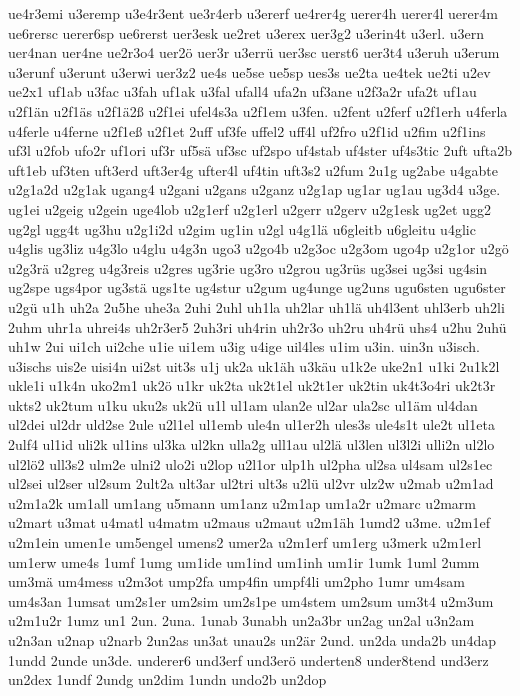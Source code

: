{ue4r3emi
u3eremp
u3e4r3ent
ue3r4erb
u3ererf
ue4rer4g
uerer4h
uerer4l
uerer4m
ue6rersc
uerer6sp
ue6rerst
uer3esk
ue2ret
u3erex
uer3g2
u3erin4t
u3erl.
u3ern
uer4nan
uer4ne
ue2r3o4
uer2ö
uer3r
u3errü
uer3sc
uerst6
uer3t4
u3eruh
u3erum
u3erunf
u3erunt
u3erwi
uer3z2
ue4s
ue5se
ue5sp
ues3s
ue2ta
ue4tek
ue2ti
u2ev
ue2x1
uf1ab
u3fac
u3fah
uf1ak
u3fal
ufall4
ufa2n
uf3ane
u2f3a2r
ufa2t
uf1au
u2f1än
u2f1äs
u2f1ä2ß
u2f1ei
ufel4s3a
u2f1em
u3fen.
u2fent
u2ferf
u2f1erh
u4ferla
u4ferle
u4ferne
u2f1eß
u2f1et
2uff
uf3fe
uffel2
uff4l
uf2fro
u2f1id
u2fim
u2f1ins
uf3l
u2fob
ufo2r
uf1ori
uf3r
uf5sä
uf3sc
uf2spo
uf4stab
uf4ster
uf4s3tic
2uft
ufta2b
uft1eb
uf3ten
uft3erd
uft3er4g
ufter4l
uf4tin
uft3s2
u2fum
2u1g
ug2abe
u4gabte
u2g1a2d
u2g1ak
ugang4
u2gani
u2gans
u2ganz
u2g1ap
ug1ar
ug1au
ug3d4
u3ge.
ug1ei
u2geig
u2gein
uge4lob
u2g1erf
u2g1erl
u2gerr
u2gerv
u2g1esk
ug2et
ugg2
ug2gl
ugg4t
ug3hu
u2g1i2d
u2gim
ug1in
u2gl
u4g1lä
u6gleitb
u6gleitu
u4glic
u4glis
ug3liz
u4g3lo
u4glu
u4g3n
ugo3
u2go4b
u2g3oc
u2g3om
ugo4p
u2g1or
u2gö
u2g3rä
u2greg
u4g3reis
u2gres
ug3rie
ug3ro
u2grou
ug3rüs
ug3sei
ug3si
ug4sin
ug2spe
ugs4por
ug3stä
ugs1te
ug4stur
u2gum
ug4unge
ug2uns
ugu6sten
ugu6ster
u2gü
u1h
uh2a
2u5he
uhe3a
2uhi
2uhl
uh1la
uh2lar
uh1lä
uh4l3ent
uhl3erb
uh2li
2uhm
uhr1a
uhrei4s
uh2r3er5
2uh3ri
uh4rin
uh2r3o
uh2ru
uh4rü
uhs4
u2hu
2uhü
uh1w
2ui
ui1ch
ui2che
u1ie
ui1em
u3ig
u4ige
uil4les
u1im
u3in.
uin3n
u3isch.
u3ischs
uis2e
uisi4n
ui2st
uit3s
u1j
uk2a
uk1äh
u3käu
u1k2e
uke2n1
u1ki
2u1k2l
ukle1i
u1k4n
uko2m1
uk2ö
u1kr
uk2ta
uk2t1el
uk2t1er
uk2tin
uk4t3o4ri
uk2t3r
ukts2
uk2tum
u1ku
uku2s
uk2ü
u1l
ul1am
ulan2e
ul2ar
ula2sc
ul1äm
ul4dan
ul2dei
ul2dr
uld2se
2ule
u2l1el
ul1emb
ule4n
ul1er2h
ules3s
ule4s1t
ule2t
ul1eta
2ulf4
ul1id
uli2k
ul1ins
ul3ka
ul2kn
ulla2g
ull1au
ul2lä
ul3len
ul3l2i
ulli2n
ul2lo
ul2lö2
ull3s2
ulm2e
ulni2
ulo2i
u2lop
u2l1or
ulp1h
ul2pha
ul2sa
ul4sam
ul2s1ec
ul2sei
ul2ser
ul2sum
2ult2a
ult3ar
ul2tri
ult3s
u2lü
ul2vr
ulz2w
u2mab
u2m1ad
u2m1a2k
um1all
um1ang
u5mann
um1anz
u2m1ap
um1a2r
u2marc
u2marm
u2mart
u3mat
u4matl
u4matm
u2maus
u2maut
u2m1äh
1umd2
u3me.
u2m1ef
u2m1ein
umen1e
um5engel
umens2
umer2a
u2m1erf
um1erg
u3merk
u2m1erl
um1erw
ume4s
1umf
1umg
um1ide
um1ind
um1inh
um1ir
1umk
1uml
2umm
um3mä
um4mess
u2m3ot
ump2fa
ump4fin
umpf4li
um2pho
1umr
um4sam
um4s3an
1umsat
um2s1er
um2sim
um2s1pe
um4stem
um2sum
um3t4
u2m3um
u2m1u2r
1umz
un1
2un.
2una.
1unab
3unabh
un2a3br
un2ag
un2al
u3n2am
u2n3an
u2nap
u2narb
2un2as
un3at
unau2s
un2är
2und.
un2da
unda2b
un4dap
1undd
2unde
un3de.
underer6
und3erf
und3erö
underten8
under8tend
und3erz
un2dex
1undf
2undg
un2dim
1undn
undo2b
un2dop
}
